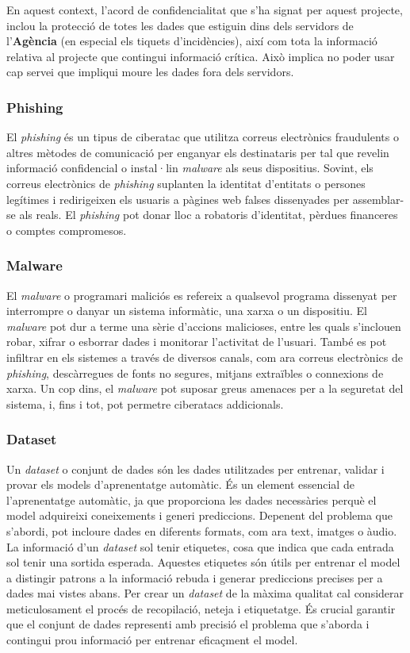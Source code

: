 En aquest context, l'acord de confidencialitat que s'ha signat per aquest projecte, inclou la protecció de totes les dades que estiguin dins dels servidors de l'\textbf{Agència} (en especial els tiquets d'incidències), així com tota la informació relativa al projecte que contingui informació crítica. Això implica no poder usar cap servei que impliqui moure les dades fora dels servidors.

\subsubsection{Phishing}
El \textit{phishing} és un tipus de ciberatac que utilitza correus electrònics fraudulents o altres mètodes de comunicació per enganyar els destinataris per tal que revelin informació confidencial o instal·lin \textit{malware} als seus dispositius. Sovint, els correus electrònics de \textit{phishing} suplanten la identitat d'entitats o persones legítimes i redirigeixen els usuaris a pàgines web falses dissenyades per assemblar-se als reals. El \textit{phishing} pot donar lloc a robatoris d'identitat, pèrdues financeres o comptes compromesos.

\subsubsection{Malware}
El \textit{malware} o programari maliciós es refereix a qualsevol programa dissenyat per interrompre o danyar un sistema informàtic, una xarxa o un dispositiu. El \textit{malware} pot dur a terme una sèrie d'accions malicioses, entre les quals s'inclouen robar, xifrar o esborrar dades i monitorar l'activitat de l'usuari. També es pot infiltrar en els sistemes a través de diversos canals, com ara correus electrònics de \textit{phishing}, descàrregues de fonts no segures, mitjans extraïbles o connexions de xarxa. Un cop dins, el \textit{malware} pot suposar greus amenaces per a la seguretat del sistema, i, fins i tot, pot permetre ciberatacs addicionals.

\subsubsection{Dataset}
Un \textit{dataset} o conjunt de dades són les dades utilitzades per entrenar, validar i provar els models d'aprenentatge automàtic. És un element essencial de l'aprenentatge automàtic, ja que proporciona les dades necessàries perquè el model adquireixi coneixements i generi prediccions. Depenent del problema que s'abordi, pot incloure dades en diferents formats, com ara text, imatges o àudio. La informació d'un \textit{dataset} sol tenir etiquetes, cosa que indica que cada entrada sol tenir una sortida esperada. Aquestes etiquetes són útils per entrenar el model a distingir patrons a la informació rebuda i generar prediccions precises per a dades mai vistes abans. Per crear un \textit{dataset} de la màxima qualitat cal considerar meticulosament el procés de recopilació, neteja i etiquetatge. És crucial garantir que el conjunt de dades representi amb precisió el problema que s'aborda i contingui prou informació per entrenar eficaçment el model.

